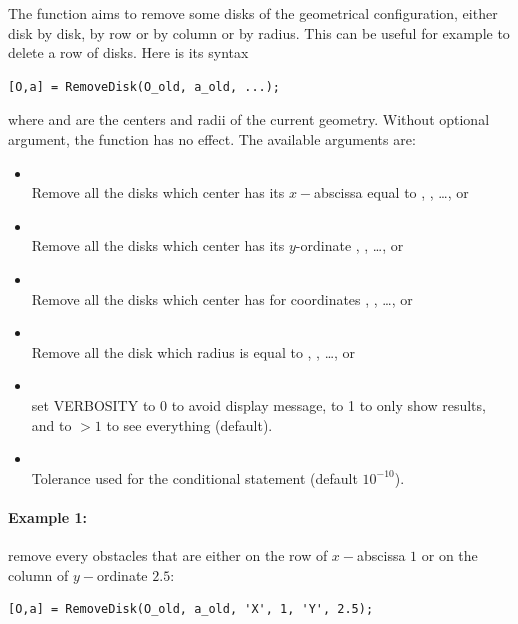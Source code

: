 The function \RemoveDisk aims to remove some disks of the geometrical configuration, either disk by disk, by row or by column or by radius. This can be useful for example to delete a row of disks. Here is its syntax
\begin{lstlisting}
[O,a] = RemoveDisk(O_old, a_old, ...);
\end{lstlisting}
where  and  are the centers and radii of the current geometry. Without optional argument, the function has no effect. The available arguments are:
\begin{itemize}
\item {}\\
Remove all the disks which center has its $x-$abscissa equal to , , \ldots, or 
\item {}\\
Remove all the disks which center has its $y$-ordinate , , \ldots, or 
\item {}\\
Remove all the disks which center has for coordinates \code{[X1;Y1]}, \code{[X2;Y2]}, \ldots, or \code{[XN;YN]}
\item {}\\
Remove all the disk which radius is equal to , , \ldots, or 
\item {}\\
set VERBOSITY to 0 to avoid display message, to 1 to only show results, and to $>1$ to see everything (default).
\item {}\\
Tolerance used for the conditional statement (default $10^{-10}$).
\end{itemize}

\paragraph{Example 1:} remove every obstacles that are either on the row of $x-$abscissa $1$ or on the column of $y-$ordinate $2.5$:
\begin{lstlisting}
[O,a] = RemoveDisk(O_old, a_old, 'X', 1, 'Y', 2.5);
\end{lstlisting}
